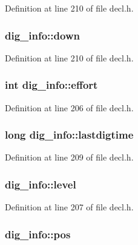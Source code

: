 Definition at line 210 of file decl.\+h.

\hypertarget{structdig__info_aa0a1830de7549e20d2ddbfca3368d143}{
\subsubsection[{down}]{ dig\+\_\+info\+::down}}\label{structdig__info_aa0a1830de7549e20d2ddbfca3368d143}


Definition at line 210 of file decl.\+h.

\hypertarget{structdig__info_acfc6cff51c35b0611d8e97b6b86a9b8e}{
\subsubsection[{effort}]{\setlength{\rightskip}{0pt plus 5cm}int dig\+\_\+info\+::effort}}\label{structdig__info_acfc6cff51c35b0611d8e97b6b86a9b8e}


Definition at line 206 of file decl.\+h.

\hypertarget{structdig__info_a554dcfbb823177376ac92358c15a7fd2}{
\subsubsection[{lastdigtime}]{\setlength{\rightskip}{0pt plus 5cm}long dig\+\_\+info\+::lastdigtime}}\label{structdig__info_a554dcfbb823177376ac92358c15a7fd2}


Definition at line 209 of file decl.\+h.

\hypertarget{structdig__info_afa100a1c1a0841e1f3b8a689712debf5}{
\subsubsection[{level}]{ dig\+\_\+info\+::level}}\label{structdig__info_afa100a1c1a0841e1f3b8a689712debf5}


Definition at line 207 of file decl.\+h.

\hypertarget{structdig__info_ae05795787c5d19119fca2d09ce2788eb}{
\subsubsection[{pos}]{ dig\+\_\+info\+::pos}}\label{structdig__info_ae05795787c5d19119fca2d09ce2788eb}


